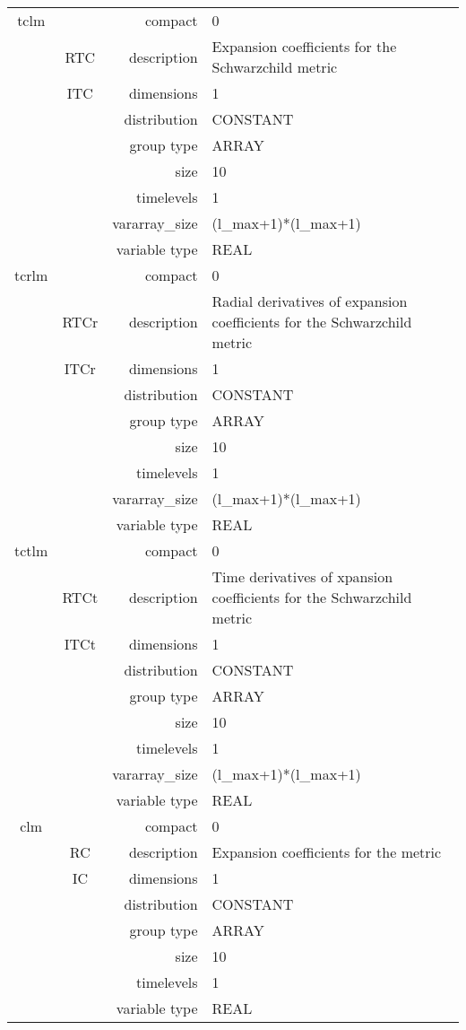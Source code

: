 \begin{tabular*}{150mm}{|c|c@{\extracolsep{\fill}}|rl|}
\hline 
tclm &  & compact & 0 \\ 
 & RTC & description & Expansion coefficients for the Schwarzchild metric \\ 
 & ITC & dimensions & 1 \\ 
 &  & distribution & CONSTANT \\ 
 &  & group type & ARRAY \\ 
 &  & size & 10 \\ 
 &  & timelevels & 1 \\ 
 &  & vararray\_size & (l\_max+1)*(l\_max+1) \\ 
 &  & variable type & REAL \\ 
\hline 
tcrlm &  & compact & 0 \\ 
 & RTCr & description & Radial  derivatives of expansion coefficients for the Schwarzchild metric \\ 
 & ITCr & dimensions & 1 \\ 
 &  & distribution & CONSTANT \\ 
 &  & group type & ARRAY \\ 
 &  & size & 10 \\ 
 &  & timelevels & 1 \\ 
 &  & vararray\_size & (l\_max+1)*(l\_max+1) \\ 
 &  & variable type & REAL \\ 
\hline 
tctlm &  & compact & 0 \\ 
 & RTCt & description & Time derivatives of xpansion coefficients for the Schwarzchild metric \\ 
 & ITCt & dimensions & 1 \\ 
 &  & distribution & CONSTANT \\ 
 &  & group type & ARRAY \\ 
 &  & size & 10 \\ 
 &  & timelevels & 1 \\ 
 &  & vararray\_size & (l\_max+1)*(l\_max+1) \\ 
 &  & variable type & REAL \\ 
\hline 
clm &  & compact & 0 \\ 
 & RC & description & Expansion coefficients for the metric \\ 
 & IC & dimensions & 1 \\ 
 &  & distribution & CONSTANT \\ 
 &  & group type & ARRAY \\ 
 &  & size & 10 \\ 
 &  & timelevels & 1 \\ 
 &  & variable type & REAL \\ 
\hline 
\end{tabular*} 



